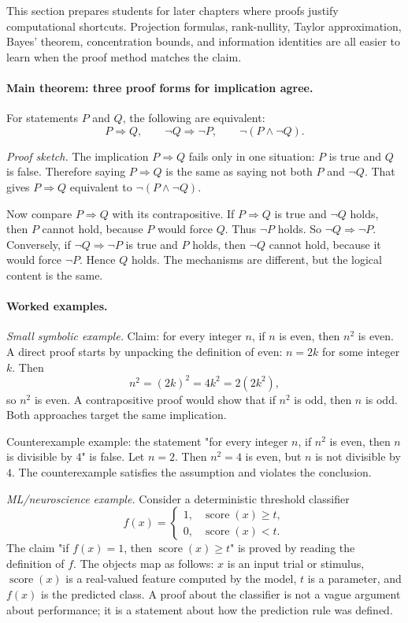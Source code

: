 This section prepares students for later chapters where proofs justify computational shortcuts. Projection formulas, rank-nullity, Taylor approximation, Bayes' theorem, concentration bounds, and information identities are all easier to learn when the proof method matches the claim.

\paragraph{Main theorem: three proof forms for implication agree.}
For statements \(P\) and \(Q\), the following are equivalent:
\[
P\Rightarrow Q,\qquad \neg Q\Rightarrow \neg P,\qquad \neg(P\wedge\neg Q).
\]

\emph{Proof sketch.} The implication \(P\Rightarrow Q\) fails only in one situation: \(P\) is true and \(Q\) is false. Therefore saying \(P\Rightarrow Q\) is the same as saying not both \(P\) and \(\neg Q\). That gives \(P\Rightarrow Q\) equivalent to \(\neg(P\wedge\neg Q)\).

Now compare \(P\Rightarrow Q\) with its contrapositive. If \(P\Rightarrow Q\) is true and \(\neg Q\) holds, then \(P\) cannot hold, because \(P\) would force \(Q\). Thus \(\neg P\) holds. So \(\neg Q\Rightarrow\neg P\). Conversely, if \(\neg Q\Rightarrow\neg P\) is true and \(P\) holds, then \(\neg Q\) cannot hold, because it would force \(\neg P\). Hence \(Q\) holds. The mechanisms are different, but the logical content is the same.

\paragraph{Worked examples.}
\emph{Small symbolic example.} Claim: for every integer \(n\), if \(n\) is even, then \(n^2\) is even. A direct proof starts by unpacking the definition of even: \(n=2k\) for some integer \(k\). Then
\[
n^2=(2k)^2=4k^2=2(2k^2),
\]
so \(n^2\) is even. A contrapositive proof would show that if \(n^2\) is odd, then \(n\) is odd. Both approaches target the same implication.

Counterexample example: the statement "for every integer \(n\), if \(n^2\) is even, then \(n\) is divisible by \(4\)" is false. Let \(n=2\). Then \(n^2=4\) is even, but \(n\) is not divisible by \(4\). The counterexample satisfies the assumption and violates the conclusion.

\emph{ML/neuroscience example.} Consider a deterministic threshold classifier
\[
f(x)=
\begin{cases}
1,& \operatorname{score}(x)\ge t,\\
0,& \operatorname{score}(x)<t.
\end{cases}
\]
The claim "if \(f(x)=1\), then \(\operatorname{score}(x)\ge t\)" is proved by reading the definition of \(f\). The objects map as follows: \(x\) is an input trial or stimulus, \(\operatorname{score}(x)\) is a real-valued feature computed by the model, \(t\) is a parameter, and \(f(x)\) is the predicted class. A proof about the classifier is not a vague argument about performance; it is a statement about how the prediction rule was defined.

